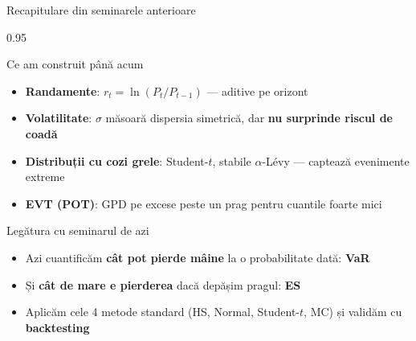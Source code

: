 \documentclass[9pt, aspectratio=169, t]{beamer}
\begin{document}
\begin{frame}[shrink=10]{Recapitulare din seminarele anterioare}
    \begin{cminipage}{0.95\textwidth}
    \begin{block}{ Ce am construit până acum}
    \begin{itemize}\setlength{\itemsep}{0pt}
        \item \textbf{Randamente}: $r_t = \ln(P_t/P_{t-1})$ --- aditive pe orizont
        \item \textbf{Volatilitate}: $\sigma$ măsoară dispersia simetrică, dar \textbf{nu surprinde riscul de coadă}
        \item \textbf{Distribuții cu cozi grele}: Student-$t$, stabile $\alpha$-Lévy --- captează evenimente extreme
        \item \textbf{EVT (POT)}: GPD pe excese peste un prag pentru cuantile foarte mici
    \end{itemize}
    \end{block}
    \vspace{0.1cm}
    \begin{alertblock}{ Legătura cu seminarul de azi}
    \begin{itemize}\setlength{\itemsep}{0pt}
        \item Azi cuantificăm \textbf{cât pot pierde mâine} la o probabilitate dată: \textbf{VaR}
        \item Și \textbf{cât de mare e pierderea} dacă depășim pragul: \textbf{ES}
        \item Aplicăm cele 4 metode standard (HS, Normal, Student-$t$, MC) și validăm cu \textbf{backtesting}
    \end{itemize}
    \end{alertblock}
    \end{cminipage}
\end{frame}
\end{document}
